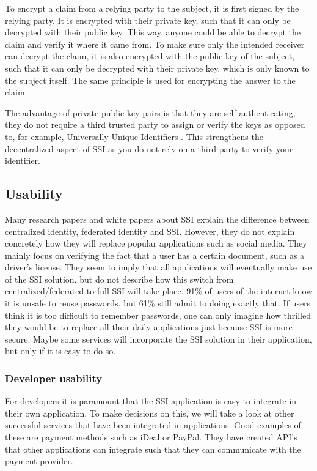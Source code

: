 To encrypt a claim from a relying party to the subject, it is first signed by the relying party. It is encrypted with their private key, such that it can only be decrypted with their public key. This way, anyone could be able to decrypt the claim and verify it where it came from. To make sure only the intended receiver can decrypt the claim, it is also encrypted with the public key of the subject, such that it can only be decrypted with their private key, which is only known to the subject itself. The same principle is used for encrypting the answer to the claim. 

The advantage of private-public key pairs is that they are self-authenticating, they do not require a third trusted party to assign or verify the keys as opposed to, for example, Universally Unique Identifiers \cite{survey}. This strengthens the decentralized aspect of SSI as you do not rely on a third party to verify your identifier.

\subsection{Usability}
Many research papers and white papers about SSI explain the difference between centralized identity, federated identity and SSI. However, they do not explain concretely how they will replace popular applications such as social media. They mainly focus on verifying the fact that a user has a certain document, such as a driver's license. They seem to imply that all applications will eventually make use of the SSI solution, but do not describe how this switch from centralized/federated to full SSI will take place. 91\% of users of the internet know it is unsafe to reuse passwords, but 61\% still admit to doing exactly that. If users think it is too difficult to remember passwords, one can only imagine how thrilled they would be to replace all their daily applications just because SSI is more secure. Maybe some services will incorporate the SSI solution in their application, but only if it is easy to do so. 

\subsubsection{Developer usability}
For developers it is paramount that the SSI application is easy to integrate in their own application. To make decisions on this, we will take a look at other successful services that have been integrated in applications. Good examples of these are payment methods such as iDeal or PayPal. They have created API's that other applications can integrate such that they can communicate with the payment provider. 

